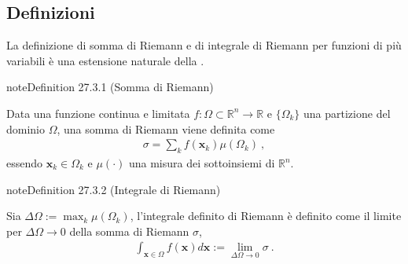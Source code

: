 \documentclass[letterpaper,10pt,italian]{jupyterBook}
\begin{document}
\subsection{Definizioni}
\label{\detokenize{ch/multivariable-calculus/integrals:definizioni}}\label{\detokenize{ch/multivariable-calculus/integrals:multivariable-calculus-integrals-def}}
\sphinxAtStartPar
La definizione di somma di Riemann e di integrale di Riemann per funzioni di più variabili è una estensione naturale della {\hyperref[\detokenize{ch/infinitesimal_calculus/integrals:infinitesimal-calculus-integrals-def}]{}}.
\label{ch/multivariable-calculus/integrals:multivariable-calculus:integrals:def:riemann-sum}
\begin{sphinxadmonition}{note}{Definition 27.3.1 (Somma di Riemann)}



\sphinxAtStartPar
Data una funzione continua e limitata \(f: \Omega \subset \mathbb{R}^n \rightarrow \mathbb{R}\) e \(\{ \Omega_k \}\) una partizione del dominio \(\Omega\), una somma di Riemann viene definita come
\begin{equation*}
\begin{split}\sigma = \sum_{k} f(\mathbf{x}_k) \mu(\Omega_k) \ ,\end{split}
\end{equation*}
\sphinxAtStartPar
essendo \(\mathbf{x}_k \in \Omega_k\) e \(\mu(\cdot)\) una misura dei sottoinsiemi di \(\mathbb{R}^n\).
\end{sphinxadmonition}
\label{ch/multivariable-calculus/integrals:multivariable-calculus:integrals:def:riemann-integral}
\begin{sphinxadmonition}{note}{Definition 27.3.2 (Integrale di Riemann)}



\sphinxAtStartPar
Sia \(\Delta \Omega := \max_k \mu(\Omega_k)\), l’integrale definito di Riemann è definito come il limite per \(\Delta \Omega \rightarrow 0\) della somma di Riemann \(\sigma\),
\begin{equation*}
\begin{split}\int_{\mathbf{x} \in \Omega} f(\mathbf{x}) d \mathbf{x} := \lim_{\Delta \Omega \rightarrow 0} \sigma \ .\end{split}
\end{equation*}\end{sphinxadmonition}

\sphinxAtStartPar
{} 
\end{document}
